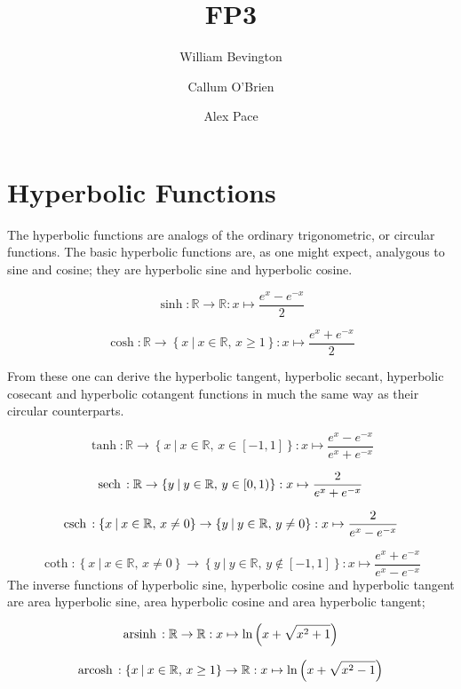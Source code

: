 \documentclass{article}
\newcommand{\st}{\:|\:}
\newcommand{\csch}{\textrm{csch\,}}
\newcommand{\sech}{\textrm{sech\,}}
\newcommand{\arsinh}{\textrm{arsinh\,}}
\newcommand{\arcosh}{\textrm{arcosh\,}}
\begin{document}
\title{FP3}
\author{William Bevington \and Callum O'Brien \and Alex Pace}
\maketitle
\tableofcontents
\newpage

\section{Hyperbolic Functions}

The hyperbolic functions are analogs of the ordinary trigonometric, or circular
functions. The basic hyperbolic functions are, as one might expect, analygous to
sine and cosine; they are hyperbolic sine and hyperbolic cosine.

\[\sinh : \mathbb{R} \rightarrow \mathbb{R} : x \mapsto \frac{e^x - e^{-x}}{2}\]

\[\cosh : \mathbb{R} \rightarrow \left\{x \st x \in \mathbb{R},\, x \geq
1\right\} : x \mapsto \frac{e^x + e^{-x}}{2}\]

\noindent From these one can derive the hyperbolic tangent, hyperbolic secant,
hyperbolic cosecant and hyperbolic cotangent functions in much the same way as
their circular counterparts.

\[\tanh : \mathbb{R} \rightarrow \left\{x \st x \in \mathbb{R},\, x \in
\left[-1, 1\right]\right\} : x \mapsto \frac{e^x - e^{-x}}{e^x + e^{-x}}\]

\[\sech : \mathbb{R} \rightarrow \left\{y \st y \in \mathbb{R},\, y \in
\left[0,1\right)\right\} : x \mapsto \frac{2}{e^x + e^{-x}}\]

\[\csch : \left\{x \st x \in \mathbb{R},\, x \neq 0 \right\} \rightarrow
\left\{y \st y \in \mathbb{R},\, y \neq 0\right\} : x \mapsto \frac{2}{e^x -
e^{-x}}\]

\[\coth : \left\{x \st x \in \mathbb{R},\, x \neq 0 \right\} \rightarrow
\left\{y \st y \in \mathbb{R},\, y \notin \left[-1, 1\right]\right\} : x \mapsto
\frac{e^x + e^{-x}}{e^x - e^{-x}}\]
\noindent The inverse functions of hyperbolic sine, hyperbolic cosine and hyperbolic tangent are area hyperbolic sine, area hyperbolic cosine and area
hyperbolic tangent;

\[\arsinh : \mathbb{R} \rightarrow \mathbb{R} : x \mapsto \ln\left(x + \sqrt{x^2
+ 1}\right)\]

\[\arcosh : \left\{x \st x \in \mathbb{R},\, x \geq 1 \right\} \rightarrow
\mathbb{R} : x \mapsto \ln\left(x + \sqrt{x^2 - 1}\right)\]
\end{document}
